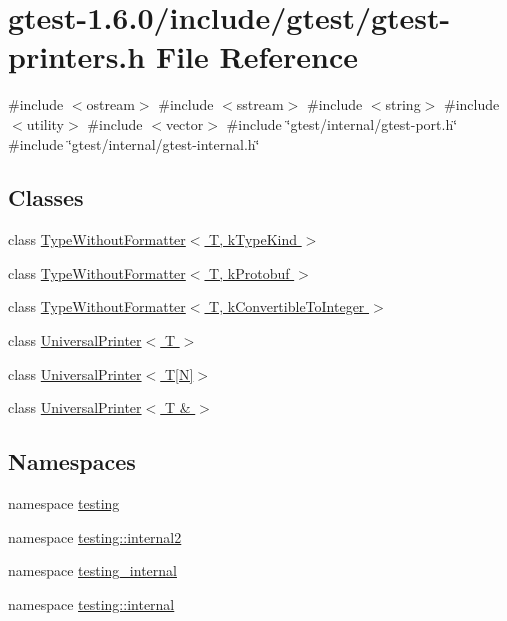 \hypertarget{gtest-printers_8h}{\section{gtest-\/1.6.0/include/gtest/gtest-\/printers.h \-File \-Reference}
\label{d0/d6d/gtest-printers_8h}
}
{\ttfamily \#include $<$ostream$>$}\*
{\ttfamily \#include $<$sstream$>$}\*
{\ttfamily \#include $<$string$>$}\*
{\ttfamily \#include $<$utility$>$}\*
{\ttfamily \#include $<$vector$>$}\*
{\ttfamily \#include \char`\"{}gtest/internal/gtest-\/port.\-h\char`\"{}}\*
{\ttfamily \#include \char`\"{}gtest/internal/gtest-\/internal.\-h\char`\"{}}\*
\subsection*{\-Classes}
\begin{DoxyCompactItemize}
\item 
class \hyperlink{classtesting_1_1internal2_1_1TypeWithoutFormatter}{\-Type\-Without\-Formatter$<$ T, k\-Type\-Kind $>$}
\item 
class \hyperlink{classtesting_1_1internal2_1_1TypeWithoutFormatter_3_01T_00_01kProtobuf_01_4}{\-Type\-Without\-Formatter$<$ T, k\-Protobuf $>$}
\item 
class \hyperlink{classtesting_1_1internal2_1_1TypeWithoutFormatter_3_01T_00_01kConvertibleToInteger_01_4}{\-Type\-Without\-Formatter$<$ T, k\-Convertible\-To\-Integer $>$}
\item 
class \hyperlink{classtesting_1_1internal_1_1UniversalPrinter}{\-Universal\-Printer$<$ T $>$}
\item 
class \hyperlink{classtesting_1_1internal_1_1UniversalPrinter_3_01T[N]_4}{\-Universal\-Printer$<$ T\mbox{[}\-N\mbox{]}$>$}
\item 
class \hyperlink{classtesting_1_1internal_1_1UniversalPrinter_3_01T_01_6_01_4}{\-Universal\-Printer$<$ T \& $>$}
\end{DoxyCompactItemize}
\subsection*{\-Namespaces}
\begin{DoxyCompactItemize}
\item 
namespace \hyperlink{namespacetesting}{testing}
\item 
namespace \hyperlink{namespacetesting_1_1internal2}{testing\-::internal2}
\item 
namespace \hyperlink{namespacetesting__internal}{testing\-\_\-internal}
\item 
namespace \hyperlink{namespacetesting_1_1internal}{testing\-::internal}
\end{DoxyCompactItemize}
